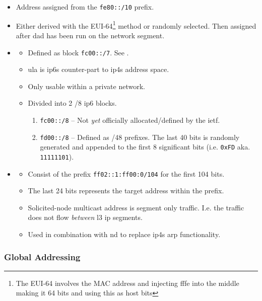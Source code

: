 \begin{itemize}
    \item Address assigned from the \texttt{fe80::/10} prefix.
    \item Either derived with the EUI-64\footnote{The EUI-64 involves the MAC address and injecting fffe into the middle making it 64 bits and using this as host bits} method or randomly selected. Then assigned after \gls{dad} has been run on the network segment.
    \item {}\cite{wiki:Unique_local_address}
    \begin{itemize}
        \item Defined as block \texttt{fc00::/7}. See .
        \item \gls{ula} is \glspl{ip6} counter-part to \glspl{ip4}  address space.
        \item Only usable within a private network.
        \item Divided into 2 /8 \gls{ip6} blocks.
        \begin{enumerate}
            \item \texttt{fc00::/8} -- Not \textit{yet} officially allocated/defined by the \gls{ietf}.
            \item \texttt{fd00::/8} -- Defined as /48 prefixes. The last 40 bits is randomly generated and appended to the first 8 significant bits {\small (i.e. \texttt{0xFD} aka. \texttt{11111101})}.
        \end{enumerate}
    \end{itemize}
    \item {}\cite{wiki:Solicited-node_multicast_address}
    \begin{itemize}
        \item Consist of the prefix \texttt{ff02::1:ff00:0/104} for the first 104 bits.
        \item The last 24 bits represents the target address within the prefix.
        \item Solicited-node multicast address is segment only traffic. I.e. the traffic does not flow \textit{between} \gls{l3} \gls{ip} segments.
        \item Used in combination with \gls{nd} to replace \glspl{ip4} \gls{arp} functionality.
    \end{itemize}
\end{itemize}

\subsubsection{Global Addressing}

